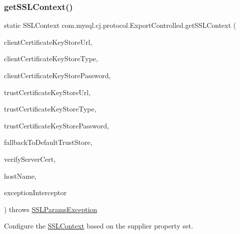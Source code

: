 \subsubsection{\texorpdfstring{get\+S\+S\+L\+Context()}{getSSLContext()}\hspace{0.1cm}{\footnotesize\ttfamily [2/2]}}
{\footnotesize\ttfamily static S\+S\+L\+Context com.\+mysql.\+cj.\+protocol.\+Export\+Controlled.\+get\+S\+S\+L\+Context (\begin{DoxyParamCaption}\item[{String}]{client\+Certificate\+Key\+Store\+Url,  }\item[{String}]{client\+Certificate\+Key\+Store\+Type,  }\item[{String}]{client\+Certificate\+Key\+Store\+Password,  }\item[{String}]{trust\+Certificate\+Key\+Store\+Url,  }\item[{String}]{trust\+Certificate\+Key\+Store\+Type,  }\item[{String}]{trust\+Certificate\+Key\+Store\+Password,  }\item[{boolean}]{fallback\+To\+Default\+Trust\+Store,  }\item[{boolean}]{verify\+Server\+Cert,  }\item[{String}]{host\+Name,  }\item[{\mbox{\hyperlink{interfacecom_1_1mysql_1_1cj_1_1exceptions_1_1_exception_interceptor}{Exception\+Interceptor}}}]{exception\+Interceptor }\end{DoxyParamCaption}) throws \mbox{\hyperlink{classcom_1_1mysql_1_1cj_1_1exceptions_1_1_s_s_l_params_exception}{S\+S\+L\+Params\+Exception}}\hspace{0.3cm}{\ttfamily [static]}}

Configure the \mbox{\hyperlink{}{S\+S\+L\+Context}} based on the supplier property set. \mbox{\label{classcom_1_1mysql_1_1cj_1_1protocol_1_1_export_controlled_a81bd557abb458b90f449ba14b7d3fe80}} 
